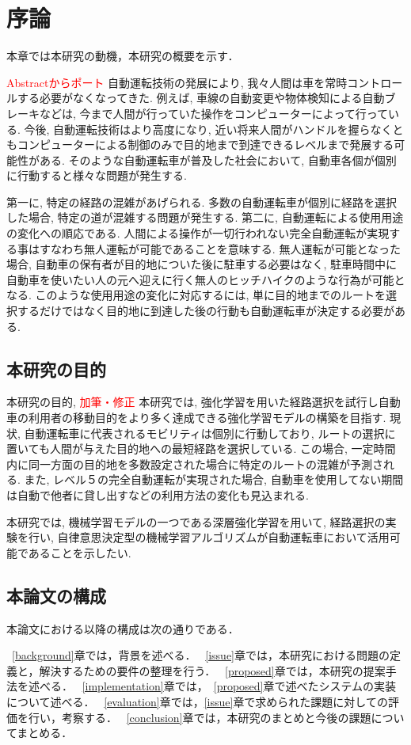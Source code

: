 \chapter{序論}
\label{introduction}

本章では本研究の動機，本研究の概要を示す．

\textcolor{red}{Abstractからポート}
自動運転技術の発展により, 我々人間は車を常時コントロールする必要がなくなってきた.
例えば, 車線の自動変更や物体検知による自動ブレーキなどは, 今まで人間が行っていた操作をコンピューターによって行っている.
今後, 自動運転技術はより高度になり, 近い将来人間がハンドルを握らなくともコンピューターによる制御のみで目的地まで到達できるレベルまで発展する可能性がある.
そのような自動運転車が普及した社会において, 自動車各個が個別に行動すると様々な問題が発生する.

第一に, 特定の経路の混雑があげられる.
多数の自動運転車が個別に経路を選択した場合, 特定の道が混雑する問題が発生する.
第二に, 自動運転による使用用途の変化への順応である. 人間による操作が一切行われない完全自動運転が実現する事はすなわち無人運転が可能であることを意味する.
無人運転が可能となった場合, 自動車の保有者が目的地についた後に駐車する必要はなく, 駐車時間中に自動車を使いたい人の元へ迎えに行く無人のヒッチハイクのような行為が可能となる.
このような使用用途の変化に対応するには, 単に目的地までのルートを選択するだけではなく目的地に到達した後の行動も自動運転車が決定する必要がある.




\section{本研究の目的}

本研究の目的, \textcolor{red}{加筆・修正}
本研究では, 強化学習を用いた経路選択を試行し自動車の利用者の移動目的をより多く達成できる強化学習モデルの構築を目指す.
現状, 自動運転車に代表されるモビリティは個別に行動しており, ルートの選択に置いても人間が与えた目的地への最短経路を選択している.
この場合, 一定時間内に同一方面の目的地を多数設定された場合に特定のルートの混雑が予測される. 
また, レベル５の完全自動運転が実現された場合, 自動車を使用してない期間は自動で他者に貸し出すなどの利用方法の変化も見込まれる.

本研究では, 機械学習モデルの一つである深層強化学習を用いて, 経路選択の実験を行い, 自律意思決定型の機械学習アルゴリズムが自動運転車において活用可能であることを示したい.


\section{本論文の構成}

本論文における以降の構成は次の通りである．

~\ref{background}章では，背景を述べる．
~\ref{issue}章では，本研究における問題の定義と，解決するための要件の整理を行う．
~\ref{proposed}章では，本研究の提案手法を述べる．
~\ref{implementation}章では，~\ref{proposed}章で述べたシステムの実装について述べる．
~\ref{evaluation}章では，\ref{issue}章で求められた課題に対しての評価を行い，考察する．
~\ref{conclusion}章では，本研究のまとめと今後の課題についてまとめる．


